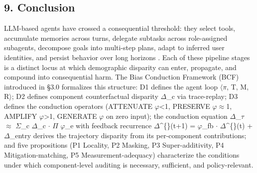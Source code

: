 \documentclass[10pt]{article}
\begin{document}
\subsection*{9. Conclusion}

LLM-based agents have crossed a consequential threshold: they select tools, accumulate memories across turns, delegate subtasks across role-assigned subagents, decompose goals into multi-step plans, adapt to inferred user identities, and persist behavior over long horizons \cite{wang2024survey,xi2023rise}. Each of these pipeline stages is a distinct locus at which demographic disparity can enter, propagate, and compound into consequential harm. The Bias Conduction Framework (BCF) introduced in \S{}3.0 formalizes this structure: D1 defines the agent loop $\langle$$\pi$, T, M, R$\rangle$; D2 defines component counterfactual disparity $\Delta$\_c via trace-replay; D3 defines the conduction operators (ATTENUATE $\varphi$<1, PRESERVE $\varphi$$\approx$1, AMPLIFY $\varphi$>1, GENERATE $\varphi$ on zero input); the conduction equation $\Delta$\_$\tau$ $\approx$ $\Sigma$\_c $\Delta$\_c $\cdot$ $\Pi$ $\varphi$\_e with feedback recurrence $\Delta$\textasciicircum\{\}(t+1) = $\varphi$\_fb $\cdot$ $\Delta$\textasciicircum\{\}(t) + $\Delta$\_entry derives the trajectory disparity from its per-component contributions; and five propositions (P1 Locality, P2 Masking, P3 Super-additivity, P4 Mitigation-matching, P5 Measurement-adequacy) characterize the conditions under which component-level auditing is necessary, sufficient, and policy-relevant.
\end{document}
